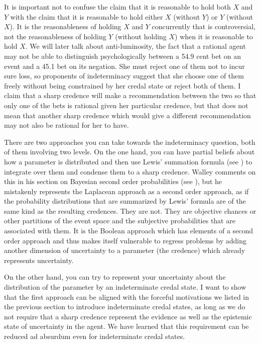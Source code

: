 It is important not to confuse the claim that it is
reasonable to hold both $X$ and $Y$ with the claim that
it is reasonable to hold either $X$ (without $Y$) or
$Y$ (without $X$). It is the reasonableness of holding
$X$ and $Y$ concurrently that is controversial, not the
reasonableness of holding $Y$ (without holding $X$)
when it is reasonable to hold $X$. We will later talk
about anti-luminosity, the fact that a rational agent
may not be able to distinguish psychologically between
a 54.9 cent bet on an event and a 45.1 bet on its
negation. She must reject one of them not to incur sure
loss, so proponents of indeterminacy suggest that she
choose one of them freely without being constrained by
her credal state or reject both of them. I claim that a
sharp credence will make a recommendation between the
two so that only one of the bets is rational given her
particular credence, but that does not mean that
another sharp credence which would give a different
recommendation may not also be rational for her to
have.

There are two approaches you can take towards the
indeterminacy question, both of them involving two
levels. On the one hand, you can have partial beliefs
about how a parameter is distributed and then use
Lewis' summation formula (see )
to integrate over them and condense them to a sharp
credence. Walley comments on this  in
his section on Bayesian second order probabilities (see
), but he mistakenly
represents the Laplacean approach as a second order
approach, as if the probability distributions that are
summarized by Lewis' formula are of the same kind as
the resulting credences. They are not. They are
objective chances or other partitions of the event
space and the subjective probabilities that are
associated with them. It is the Boolean approach which
has elements of a second order approach and thus makes
itself vulnerable to regress problems by adding another
dimension of uncertainty to a parameter (the credence)
which already represents uncertainty.

On the other hand, you can try to represent your
uncertainty about the distribution of the parameter by
an indeterminate credal state. I want to show that the
first approach can be aligned with the forceful
motivations we listed in the previous section to
introduce indeterminate credal states, as long as we do
not require that a sharp credence represent the
evidence as well as the epistemic state of uncertainty
in the agent. We have learned that this requirement can
be reduced ad absurdum even for indeterminate credal
states.

